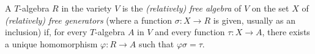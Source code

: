 A $T$-algebra $R$ in the variety $V$ is the \emph{(relatively) free algebra} of $V$ on the set $X$ of \emph{(relatively) free generators} (where a function $\sigma: X \to R$ is given, usually as an inclusion) if, for every $T$-algebra $A$ in $V$ and every function $\tau: X \to A$, there exists a unique homomorphism $\varphi: R \to A$ such that $\varphi\sigma = \tau$.
